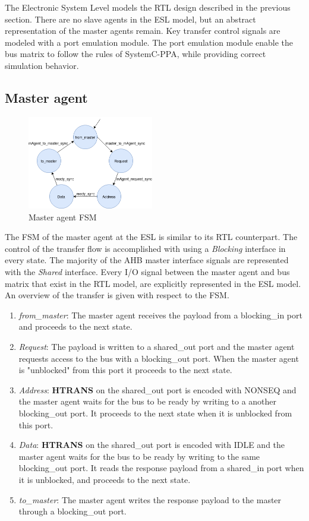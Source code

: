 The Electronic System Level models the RTL design described in the previous section. There are no slave agents in the ESL model, but an abstract representation of the master agents remain. Key transfer control signals are modeled with a port emulation module. The port emulation module enable the bus matrix to follow the rules of SystemC-PPA, while providing correct simulation behavior.  
\newpage

\subsection{Master agent}
\begin{figure}
\includegraphics[width=5.5cm]{figs/ESL/mAgent_ESL.png}
\caption{Master agent FSM}\label{fig:eafsm}
\end{figure}
The FSM of the master agent at the ESL is similar to its RTL counterpart. The control of the transfer flow is accomplished with using a \textit{Blocking} interface in every state. The majority of the AHB master interface signals are represented with the \textit{Shared} interface. Every I/O signal between the master agent and bus matrix that exist in the RTL model, are explicitly represented in the ESL model. An overview of the transfer is given with respect to the FSM. \\
\vspace{0.5cm} 

\begin{enumerate}
 \item \textit{from\_master}: The master agent receives the payload from a blocking\_in port and proceeds to the next state.
 \item \textit{Request}: The payload is written to a shared\_out port and the master agent requests access to the bus with a blocking\_out port. When the master agent is "unblocked" from this port it proceeds to the next state.
 \item \textit{Address}: \textbf{HTRANS} on the shared\_out port is encoded with NONSEQ and the master agent waits for the bus to be ready by writing to a another blocking\_out port. It proceeds to the next state when it is unblocked from this port. 
 \item \textit{Data}: \textbf{HTRANS} on the shared\_out port is encoded with IDLE and the master agent waits for the bus to be ready by writing to the same blocking\_out port. It reads the response payload from a shared\_in port when it is unblocked, and proceeds to the next state. 
 \item \textit{to\_master}: The master agent writes the response payload to the master through a blocking\_out port. 
\end{enumerate} 

